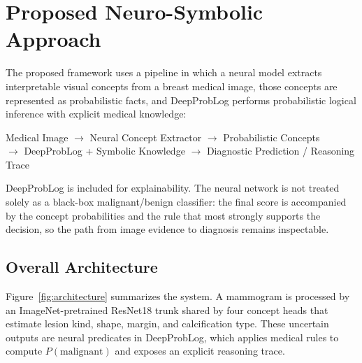 \section{Proposed Neuro-Symbolic Approach}
\label{sec:methodology}

The proposed framework uses a pipeline in which a neural model extracts interpretable visual concepts from a breast medical image, those concepts are represented as probabilistic facts, and DeepProbLog performs probabilistic logical inference with explicit medical knowledge:

\begin{center}
\small
Medical Image $\rightarrow$ Neural Concept Extractor $\rightarrow$ Probabilistic Concepts \\
$\rightarrow$ DeepProbLog + Symbolic Knowledge $\rightarrow$ Diagnostic Prediction / Reasoning Trace
\end{center}

DeepProbLog is included for explainability. The neural network is not treated solely as a black-box malignant/benign classifier: the final score is accompanied by the concept probabilities and the rule that most strongly supports the decision, so the path from image evidence to diagnosis remains inspectable.

\subsection{Overall Architecture}
\label{sec:architecture}

Figure~\ref{fig:architecture} summarizes the system. A mammogram is processed by an ImageNet-pretrained ResNet18 trunk shared by four concept heads that estimate lesion kind, shape, margin, and calcification type. These uncertain outputs are neural predicates in DeepProbLog, which applies medical rules to compute $P(\mathrm{malignant})$ and exposes an explicit reasoning trace.

